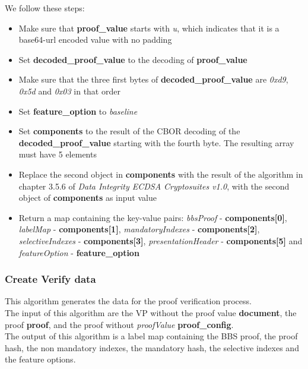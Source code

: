 \documentclass[
	a4paper               %
	,BCOR=0mm            %
	,bibliography=totoc   %
	,listof=totoc         %
	,monolingual
	,twoside=false
]{bfhthesis}              %
\begin{document}
We follow these steps:
\begin{itemize}
	\item Make sure that \textbf{proof\_value} starts with \textit{u}, which indicates that it is a base64-url encoded value with no padding
	\item Set \textbf{decoded\_proof\_value} to the decoding of \textbf{proof\_value}
	\item Make sure that the three first bytes of \textbf{decoded\_proof\_value} are \textit{0xd9}, \textit{0x5d} and \textit{0x03} in that order
	\item Set \textbf{feature\_option} to \textit{baseline}
	\item Set \textbf{components} to the result of the CBOR decoding of the \textbf{decoded\_proof\_value} starting with the fourth byte. The resulting array must have 5 elements
	\item Replace the second object in \textbf{components} with the result of the algorithm in chapter 3.5.6 of \textit{Data Integrity ECDSA Cryptosuites v1.0}\cite{ecdsa}, with the second object of \textbf{components} as input value
	\item Return a map containing the key-value pairs: \textit{bbsProof} - \textbf{components[0]}, \textit{labelMap} - \textbf{components[1]}, \textit{mandatoryIndexes} - \textbf{components[2]}, \textit{selectiveIndexes} - \textbf{components[3]}, \textit{presentationHeader} - \textbf{components[5]} and \textit{featureOption} - \textbf{feature\_option}
\end{itemize}

\subsubsection{Create Verify data}
\label{subsub:createverifydata}
This algorithm generates the data for the proof verification process.\\

The input of this algorithm are the VP without the proof value \textbf{document}, the proof \textbf{proof}, and the proof without \textit{proofValue} \textbf{proof\_config}.\\

The output of this algorithm is a label map containing the BBS proof, the proof hash, the non mandatory indexes, the mandatory hash, the selective indexes and the feature options.\\
\end{document}
